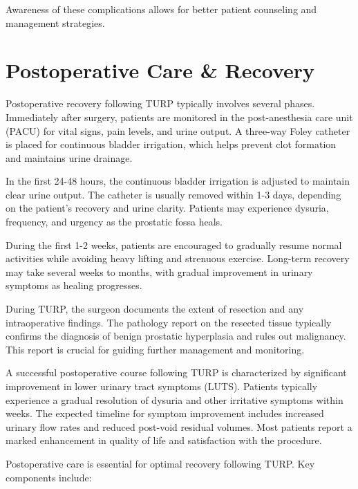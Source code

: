 Awareness of these complications allows for better patient counseling and management strategies.

\section*{Postoperative Care \& Recovery}
Postoperative recovery following TURP typically involves several phases. Immediately after surgery, patients are monitored in the post-anesthesia care unit (PACU) for vital signs, pain levels, and urine output. A three-way Foley catheter is placed for continuous bladder irrigation, which helps prevent clot formation and maintains urine drainage.

In the first 24-48 hours, the continuous bladder irrigation is adjusted to maintain clear urine output. The catheter is usually removed within 1-3 days, depending on the patient's recovery and urine clarity. Patients may experience dysuria, frequency, and urgency as the prostatic fossa heals. 

During the first 1-2 weeks, patients are encouraged to gradually resume normal activities while avoiding heavy lifting and strenuous exercise. Long-term recovery may take several weeks to months, with gradual improvement in urinary symptoms as healing progresses.

During TURP, the surgeon documents the extent of resection and any intraoperative findings. The pathology report on the resected tissue typically confirms the diagnosis of benign prostatic hyperplasia and rules out malignancy. This report is crucial for guiding further management and monitoring.

A successful postoperative course following TURP is characterized by significant improvement in lower urinary tract symptoms (LUTS). Patients typically experience a gradual resolution of dysuria and other irritative symptoms within weeks. The expected timeline for symptom improvement includes increased urinary flow rates and reduced post-void residual volumes. Most patients report a marked enhancement in quality of life and satisfaction with the procedure.

Postoperative care is essential for optimal recovery following TURP. Key components include:

